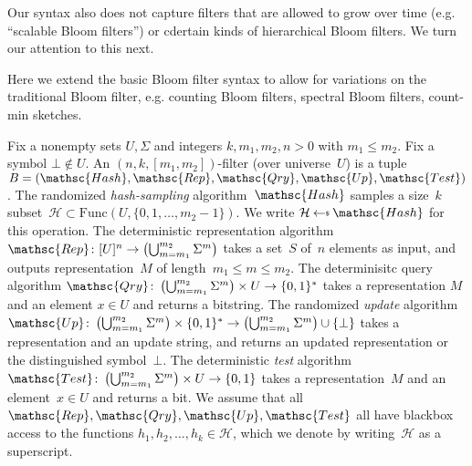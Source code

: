 Our syntax also does not capture filters that are allowed to grow over time (e.g. ``scalable Bloom filters'') or cdertain kinds of hierarchical Bloom filters.  We turn our attention to this next.


Here we extend the basic Bloom filter syntax to allow for variations on the traditional Bloom filter, e.g. counting Bloom filters, spectral Bloom filters, count-min sketches.  

Fix a nonempty sets $U,\Sigma$ and integers $k,m_1,m_2,n>0$ with $m_1 \leq m_2$.  Fix a symbol $\bot \not\in U$.  An $(n,k,[m_1,m_2])$-filter (over universe~$U$) is a tuple  $B=(\mathsc{Hash},\mathsc{Rep},\mathsc{Qry},\mathsc{Up}, \mathsc{Test})$.   
%
The randomized \emph{hash-sampling} algorithm~$\mathsc{Hash}$ samples a size~$k$ subset~$\mathcal{H} \subset \mathrm{Func}(U,\{0,1,\ldots,m_2-1\})$.  We write $\mathcal{H} \getsr \mathsc{Hash}$ for this operation.
%
The deterministic representation algorithm $\mathsc{Rep}\colon [U]^n \rightarrow \left(\bigcup_{m=m_1}^{m_2}\Sigma^m\right)$ takes a set~$S$ of~$n$ elements as input, and outputs representation~$M$ of length~$m_1 \leq m \leq m_2$.
%
The determinisitc query algorithm $\mathsc{Qry}\colon \left(\bigcup_{m=m_1}^{m_2}\Sigma^m \right)\times U \rightarrow \bits^*$ takes a representation $M$ and an element $x \in U$ and returns a bitstring.  
%
The randomized \emph{update} algorithm $\mathsc{Up}\colon \left(\bigcup_{m=m_1}^{m_2}\Sigma^m \right)\times \bits^* \rightarrow \left(\bigcup_{m=m_1}^{m_2}\Sigma^m \right) \cup \{\bot\}$ takes a representation and an update string, and returns an updated representation or the distinguished symbol~$\bot$.  
%
The deterministic \emph{test} algorithm $\mathsc{Test} \colon \left(\bigcup_{m=m_1}^{m_2}\Sigma^m \right) \times U \rightarrow \bits$ takes a representation~$M$ and an element~$x \in U$ and returns a bit.
%
We assume that all $\mathsc{Rep},\mathsc{Qry},\mathsc{Up},\mathsc{Test}$ all have blackbox access to the functions $h_1,h_2,\ldots,h_k \in \mathcal{H}$, which we denote by writing~$\mathcal{H}$ as a superscript.   

